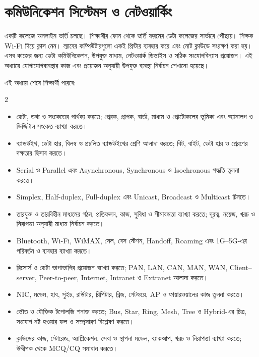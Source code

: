 
\ifdefined\chTwoStandalone\else{}\chTwoGeometry{\newgeometry}\fi
\begingroup


\setlength{\headwidth}{\textwidth}
\chapter{কমিউনিকেশন সিস্টেমস ও নেটওয়ার্কিং}

একটি কলেজে অনলাইন ভর্তি চলছে। শিক্ষার্থীর ফোন থেকে ভর্তি ফরমের ডেটা কলেজের সার্ভারে পৌঁছায়। শিক্ষক Wi-Fi দিয়ে ক্লাস নেন। ল্যাবের কম্পিউটারগুলো একই প্রিন্টার ব্যবহার করে এবং নোট ক্লাউডে সংরক্ষণ করা হয়। এসব কাজের জন্য ডেটা কমিউনিকেশন, উপযুক্ত মাধ্যম, নেটওয়ার্ক ডিভাইস ও সঠিক সংযোগবিন্যাস প্রয়োজন। এই অধ্যায়ে যোগাযোগব্যবস্থার কাজ এবং প্রয়োজন অনুযায়ী উপযুক্ত ব্যবস্থা নির্বাচন শেখানো হয়েছে।

\begin{learningbox}
এই অধ্যায় শেষে শিক্ষার্থী পারবে:
\begin{multicols}{2}
\begin{itemize}
\item ডেটা, তথ্য ও সংকেতের পার্থক্য করতে; প্রেরক, প্রাপক, বার্তা, মাধ্যম ও প্রোটোকলের ভূমিকা এবং অ্যানালগ ও ডিজিটাল সংকেত ব্যাখ্যা করতে।
\item ব্যান্ডউইথ, ডেটা হার, বিলম্ব ও প্রচলিত ব্যান্ডউইথের শ্রেণি আলাদা করতে; বিট, বাইট, ডেটা হার ও প্রেরণের দক্ষতার হিসাব করতে।
\item Serial ও Parallel এবং Asynchronous, Synchronous ও Isochronous পদ্ধতি তুলনা করতে।
\item Simplex, Half-duplex, Full-duplex এবং Unicast, Broadcast ও Multicast চিনতে।
\item তারযুক্ত ও তারবিহীন মাধ্যমের গঠন, প্রতিফলন, কাজ, সুবিধা ও সীমাবদ্ধতা ব্যাখ্যা করতে; দূরত্ব, নয়েজ, খরচ ও নিরাপত্তা অনুযায়ী মাধ্যম নির্বাচন করতে।
\item Bluetooth, Wi-Fi, WiMAX, সেল, বেস স্টেশন, Handoff, Roaming এবং 1G–5G-এর পরিবর্তন ও ব্যবহার ব্যাখ্যা করতে।
\item রিসোর্স ও ডেটা ভাগাভাগির প্রয়োজন ব্যাখ্যা করতে; PAN, LAN, CAN, MAN, WAN, Client–server, Peer-to-peer, Internet, Intranet ও Extranet আলাদা করতে।
\item NIC, মডেম, হাব, সুইচ, রাউটার, রিপিটার, ব্রিজ, গেটওয়ে, AP ও ফায়ারওয়ালের কাজ তুলনা করতে।
\item ভৌত ও যৌক্তিক টপোলজি শনাক্ত করতে; Bus, Star, Ring, Mesh, Tree ও Hybrid-এর চিত্র, সংযোগ নষ্ট হওয়ার ফল ও সম্প্রসারণ বিশ্লেষণ করতে।
\item ক্লাউডের কাজ, স্টোরেজ, অ্যাপ্লিকেশন, সেবা ও স্থাপনা মডেল, ব্যাকআপ, খরচ ও নিরাপত্তা ব্যাখ্যা করতে; উদ্দীপক থেকে MCQ/CQ সমাধান করতে।
\end{itemize}
\end{multicols}
\end{learningbox}

